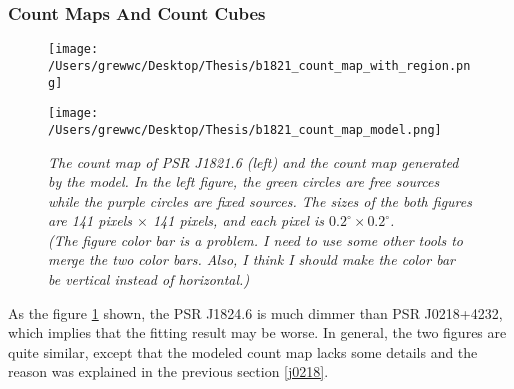 \documentclass[12pt]{report}
\newcommand{\mycaption}[1]{\caption{\textit{\footnotesize #1}}}
\begin{document}
              \subsubsection{Count Maps And Count Cubes}
              \begin{figure}[!ht]
                \begin{center}
                \begin{minipage}{0.45\textwidth}
                  \begin{center} 
                    \texttt{[image: /Users/grewwc/Desktop/Thesis/b1821\_count\_map\_with\_region.png]}
                  \end{center}
                \end{minipage}
                \begin{minipage}{0.45\textwidth}
                  \begin{center}
                    \texttt{[image: /Users/grewwc/Desktop/Thesis/b1821\_count\_map\_model.png]}
                  \end{center}
                \end{minipage}
              \end{center}

                \centering
                \begin{minipage}{\textwidth}
                  \mycaption{The count map of PSR J1821.6 (left) and the count map generated by the model. In the left figure,
                  the green circles are free sources while the purple circles are fixed sources.
                  The sizes of the both figures are 141 pixels $\times$ 141 pixels, 
                  and each pixel is $0.2^\circ \times 0.2^\circ$. 
                  \\ (The figure color bar is a problem. I need to use some other tools to merge the two color bars. 
                  Also, I think I should make the color bar be vertical instead of horizontal.)}
                  \label{fig: b1821_count_map_with_region_and_model}
                \end{minipage}
              \end{figure}
              
              As the figure \ref{fig: b1821_count_map_with_region_and_model} shown, the PSR J1824.6 is much dimmer than
              PSR J0218+4232, which implies that the fitting result may be worse. In general, the two figures are quite 
              similar, except that the modeled count map lacks some details and the reason was explained in the previous 
              section \ref{j0218}. 
            
\end{document}
